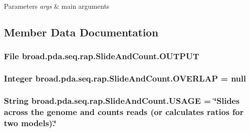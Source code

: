 \begin{DoxyParams}{Parameters}
{\em args} & main arguments \\
\hline
\end{DoxyParams}


\subsection{Member Data Documentation}
\hypertarget{classbroad_1_1pda_1_1seq_1_1rap_1_1_slide_and_count_a257060b25d6c2b19701fb4d18d92a0e1}{
\subsubsection[{O\+U\+T\+P\+U\+T}]{\setlength{\rightskip}{0pt plus 5cm}File broad.\+pda.\+seq.\+rap.\+Slide\+And\+Count.\+O\+U\+T\+P\+U\+T}}\label{classbroad_1_1pda_1_1seq_1_1rap_1_1_slide_and_count_a257060b25d6c2b19701fb4d18d92a0e1}
\hypertarget{classbroad_1_1pda_1_1seq_1_1rap_1_1_slide_and_count_a380a0603d14792e097d500e7c5f6c41c}{
\subsubsection[{O\+V\+E\+R\+L\+A\+P}]{\setlength{\rightskip}{0pt plus 5cm}Integer broad.\+pda.\+seq.\+rap.\+Slide\+And\+Count.\+O\+V\+E\+R\+L\+A\+P = null}}\label{classbroad_1_1pda_1_1seq_1_1rap_1_1_slide_and_count_a380a0603d14792e097d500e7c5f6c41c}
\hypertarget{classbroad_1_1pda_1_1seq_1_1rap_1_1_slide_and_count_ac67e77a472d934625fa493ad461578ac}{
\subsubsection[{U\+S\+A\+G\+E}]{\setlength{\rightskip}{0pt plus 5cm}String broad.\+pda.\+seq.\+rap.\+Slide\+And\+Count.\+U\+S\+A\+G\+E = \char`\"{}Slides across the genome and counts reads (or calculates ratios for two models).\char`\"{}}}\label{classbroad_1_1pda_1_1seq_1_1rap_1_1_slide_and_count_ac67e77a472d934625fa493ad461578ac}
